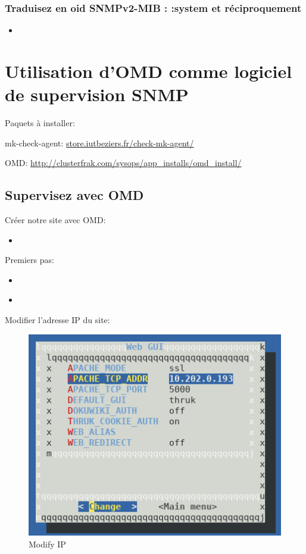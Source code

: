 \documentclass[10pt,a4paper]{article}
\newcommand{\insertcode}[2]{\begin{itemize}\item[]\end{itemize}}
\begin{document}
\subsubsection{Traduisez en oid SNMPv2-MIB : :system et réciproquement}
\insertcode{commande/7.txt}{Traduction}

\section{Utilisation d’OMD comme logiciel de supervision SNMP}

Paquets à installer:

mk-check-agent: \url{store.iutbeziers.fr/check-mk-agent/}

OMD: \url{http://clusterfrak.com/sysops/app_installs/omd_install/}

\subsection{Supervisez avec OMD}


Créer notre site avec OMD:
\insertcode{commande/a.txt}{Création iutbeziers}

Premiers pas:
\insertcode{commande/b.txt}{Afficher status du site}


\insertcode{commande/c.txt}{Démarrer notre site IURBEZIERS}

\newpage
Modifier l'adresse IP du site:



  \begin{figure}[!h]
\centering
\includegraphics[scale=1]{image/omdip.png}
\caption{Modify IP}
\label{figure}

\end{figure}
\end{document}
